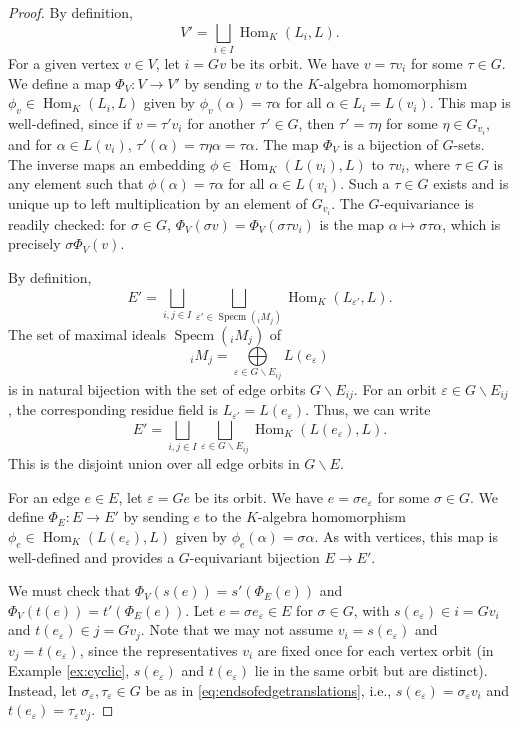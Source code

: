 \documentclass[a4paper,12pt,reqno]{amsart}
\DeclareMathOperator{\Specm}{\mathrm{Specm}}
\DeclareMathOperator{\Hom}{\mathrm{Hom}}
\theoremstyle{plain}
\theoremstyle{remark}
\begin{document}
\begin{proof}
    \smallskip
     By definition,
    \[
    V' = \bigsqcup\limits_{i\in I} \Hom_K(L_i, L).
    \]
    For a given vertex $v \in V$, let $i=Gv$ be its orbit. We have $v=\tau v_i$ for some $\tau \in G$. We define a map $\Phi_V\colon V \to V'$ by sending $v$ to the $K$-algebra homomorphism $\phi_v \in \Hom_K(L_i,L)$ given by $\phi_v(\alpha) = \tau \alpha$ for all $\alpha\in L_i = L(v_i)$. This map is well-defined, since if $v=\tau'v_i$ for another $\tau'\in G$, then $\tau'=\tau \eta$ for some $\eta\in G_{v_i}$, and for $\alpha\in L(v_i)$, $\tau'(\alpha) = \tau \eta \alpha = \tau \alpha$. The map $\Phi_V$ is a bijection of $G$-sets. The inverse maps an embedding $\phi \in \Hom_K(L(v_i),L)$ to $\tau v_i$, where $\tau\in G$ is any element such that $\phi(\alpha)=\tau \alpha$ for all $\alpha\in L(v_i)$. Such a $\tau\in G$ exists and is unique up to left multiplication by an element of $G_{v_i}$. The $G$-equivariance is readily checked: for $\sigma\in G$, $\Phi_V(\sigma v)=\Phi_V(\sigma \tau v_i)$ is the map $\alpha \mapsto \sigma \tau \alpha$, which is precisely $\sigma \Phi_V(v)$.

    \smallskip
     By definition,
    \[
    E' = \bigsqcup\limits_{i,j\in I}\bigsqcup\limits_{\varepsilon'\in\Specm({}_iM_j)}\Hom_{K}(L_{\varepsilon'},L).
    \]
    The set of maximal ideals $\Specm({}_iM_j)$ of
    \[
      {}_iM_j = \bigoplus\limits_{\varepsilon \in G\backslash E_{ij}} L(e_\varepsilon)
    \]
    is in natural bijection with the set of edge orbits $G\backslash E_{ij}$. For an orbit $\varepsilon \in G\backslash E_{ij}$, the corresponding residue field is $L_{\varepsilon'} = L(e_\varepsilon)$. Thus, we can write
    \[
    E' = \bigsqcup\limits_{i,j\in I}\bigsqcup_{\varepsilon \in G\backslash E_{ij}} \Hom_{K}(L(e_\varepsilon),L).
    \]
    This is the disjoint union over all edge orbits in $G\backslash E$.

    For an edge $e\in E$, let $\varepsilon=Ge$ be its orbit. We have $e=\sigma e_\varepsilon$ for some $\sigma\in G$. We define $\Phi_E\colon E \to E'$ by sending $e$ to the $K$-algebra homomorphism $\phi_e \in \Hom_{K}(L(e_\varepsilon),L)$ given by $\phi_e(\alpha)=\sigma \alpha$. As with vertices, this map is well-defined and provides a $G$-equivariant bijection $E \to E'$.

    \smallskip
     We must check that $\Phi_V(s(e)) = s'(\Phi_E(e))$ and $\Phi_V(t(e)) = t'(\Phi_E(e))$. Let $e=\sigma e_\varepsilon \in E$ for $\sigma\in G$, with $s(e_\varepsilon)\in i=Gv_i$ and $t(e_\varepsilon)\in j=Gv_j$. Note that we may not assume $v_i=s(e_\varepsilon)$ and $v_j=t(e_\varepsilon)$, since the representatives $v_i$ are fixed once for each vertex orbit (in Example \ref{ex:cyclic}, $s(e_\varepsilon)$ and $t(e_\varepsilon)$ lie in the same orbit but are distinct). Instead, let $\sigma_\varepsilon,\tau_\varepsilon\in G$ be as in \eqref{eq:endsofedgetranslations}, i.e., $s(e_\varepsilon)=\sigma_\varepsilon v_i$ and $t(e_\varepsilon)=\tau_\varepsilon v_j$.


\end{proof}
\end{document}
